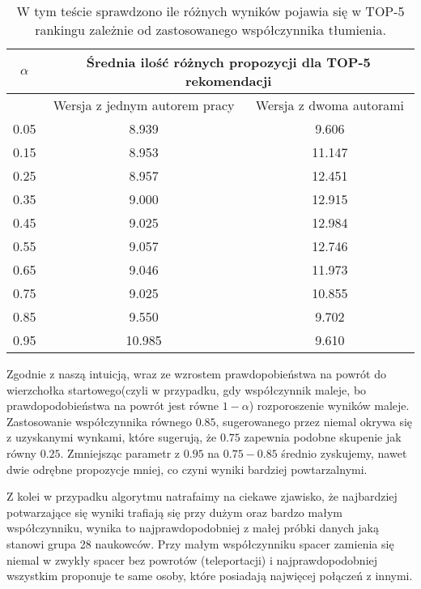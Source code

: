 \begin{table}[h]
        \centering
\begin{tabular}{c|c|c|}
$\alpha$ & \multicolumn{2}{c|}{Średnia ilość różnych propozycji dla TOP-5 rekomendacji} \\ \hline
& Wersja z jednym autorem pracy&Wersja z dwoma autorami \\ \hline
0.05 & 8.939 & 9.606\\
0.15 & 8.953 & 11.147\\
0.25 & 8.957 & 12.451\\
0.35 & 9.000 & 12.915\\
0.45 & 9.025 & 12.984\\
0.55 & 9.057 & 12.746\\
0.65 & 9.046 & 11.973\\
0.75 & 9.025 & 10.855\\
0.85 & 9.550 & 9.702\\
0.95 & 10.985 & 9.610
\end{tabular}
\caption{W tym teście sprawdzono ile różnych wyników pojawia się w TOP-5 rankingu zależnie od zastosowanego współczynnika tłumienia.}
\label{table:5}
\end{table}

Zgodnie z naszą intuicją, wraz ze wzrostem prawdopobieństwa na powrót do wierzchołka startowego(czyli w przypadku, gdy współczynnik maleje, bo prawdopodobieństwa na powrót jest równe $1-\alpha$) rozporoszenie wyników maleje. Zastosowanie współczynnika równego $0.85$, sugerowanego przez \cite{RecommenderASurvey} niemal okrywa się z uzyskanymi wynkami, które sugerują, że  $0.75$ zapewnia podobne skupenie jak  równy $0.25$. Zmniejsząc parametr z $0.95$ na $0.75-0.85$ średnio zyskujemy, nawet dwie odrębne propozycje mniej, co czyni wyniki bardziej powtarzalnymi.

Z kolei w przypadku algorytmu natrafaimy na ciekawe zjawisko, że najbardziej potwarzające się wyniki trafiają się przy dużym oraz bardzo małym współczynniku, wynika to najprawdopodobniej z małej próbki danych jaką stanowi grupa 28 naukowców. Przy małym współczynniku spacer zamienia się niemal w zwykły spacer bez powrotów (teleportacji) i najprawdopodobniej wszystkim proponuje te same osoby, które posiadają najwięcej połączeń z innymi.